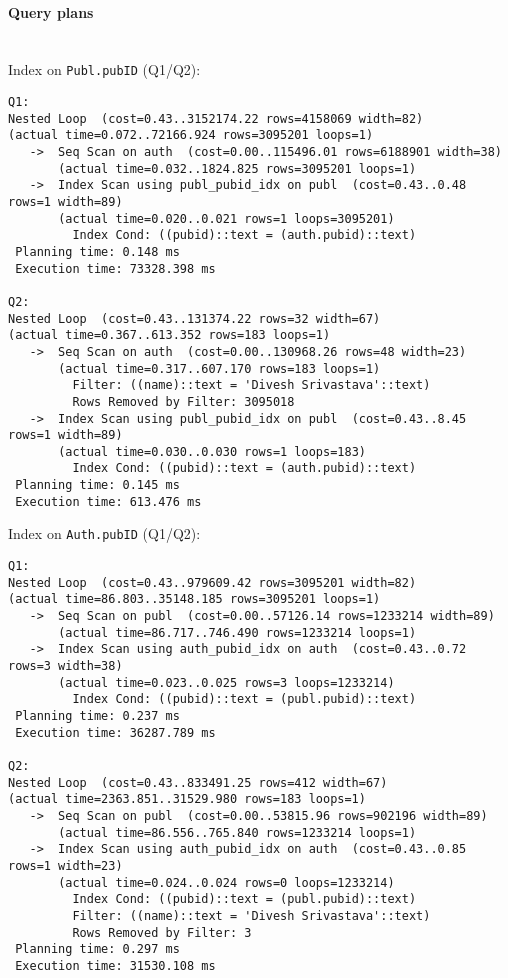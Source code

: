 \documentclass[11pt]{scrartcl}
\begin{document}
\paragraph{Query plans}\mbox{}\\ 

\noindent Index on {\tt Publ.pubID} (Q1/Q2):
{\small
\begin{verbatim}
Q1:
Nested Loop  (cost=0.43..3152174.22 rows=4158069 width=82)
(actual time=0.072..72166.924 rows=3095201 loops=1)
   ->  Seq Scan on auth  (cost=0.00..115496.01 rows=6188901 width=38)
       (actual time=0.032..1824.825 rows=3095201 loops=1)
   ->  Index Scan using publ_pubid_idx on publ  (cost=0.43..0.48 rows=1 width=89)
       (actual time=0.020..0.021 rows=1 loops=3095201)
         Index Cond: ((pubid)::text = (auth.pubid)::text)
 Planning time: 0.148 ms
 Execution time: 73328.398 ms

Q2:
Nested Loop  (cost=0.43..131374.22 rows=32 width=67)
(actual time=0.367..613.352 rows=183 loops=1)
   ->  Seq Scan on auth  (cost=0.00..130968.26 rows=48 width=23)
       (actual time=0.317..607.170 rows=183 loops=1)
         Filter: ((name)::text = 'Divesh Srivastava'::text)
         Rows Removed by Filter: 3095018
   ->  Index Scan using publ_pubid_idx on publ  (cost=0.43..8.45 rows=1 width=89)
       (actual time=0.030..0.030 rows=1 loops=183)
         Index Cond: ((pubid)::text = (auth.pubid)::text)
 Planning time: 0.145 ms
 Execution time: 613.476 ms
\end{verbatim}
}

\noindent Index on {\tt Auth.pubID} (Q1/Q2):
{\small
\begin{verbatim}
Q1:
Nested Loop  (cost=0.43..979609.42 rows=3095201 width=82)
(actual time=86.803..35148.185 rows=3095201 loops=1)
   ->  Seq Scan on publ  (cost=0.00..57126.14 rows=1233214 width=89)
       (actual time=86.717..746.490 rows=1233214 loops=1)
   ->  Index Scan using auth_pubid_idx on auth  (cost=0.43..0.72 rows=3 width=38)
       (actual time=0.023..0.025 rows=3 loops=1233214)
         Index Cond: ((pubid)::text = (publ.pubid)::text)
 Planning time: 0.237 ms
 Execution time: 36287.789 ms

Q2:
Nested Loop  (cost=0.43..833491.25 rows=412 width=67)
(actual time=2363.851..31529.980 rows=183 loops=1)
   ->  Seq Scan on publ  (cost=0.00..53815.96 rows=902196 width=89)
       (actual time=86.556..765.840 rows=1233214 loops=1)
   ->  Index Scan using auth_pubid_idx on auth  (cost=0.43..0.85 rows=1 width=23)
       (actual time=0.024..0.024 rows=0 loops=1233214)
         Index Cond: ((pubid)::text = (publ.pubid)::text)
         Filter: ((name)::text = 'Divesh Srivastava'::text)
         Rows Removed by Filter: 3
 Planning time: 0.297 ms
 Execution time: 31530.108 ms
\end{verbatim}
}
\end{document}
